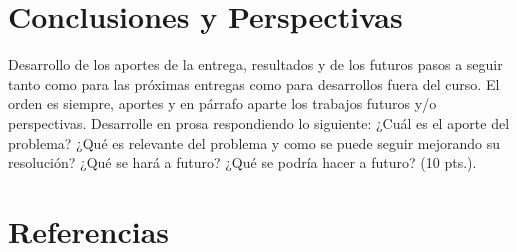 \documentclass[journal, 10pt]{IEEEtran}
\begin{document}


\section{Conclusiones y Perspectivas}

Desarrollo de los aportes de la entrega, resultados y de los futuros pasos a seguir tanto como para las próximas entregas como para desarrollos fuera del curso. El orden es siempre, aportes y en párrafo aparte los trabajos futuros y/o perspectivas. Desarrolle en prosa respondiendo lo siguiente: ¿Cuál es el aporte del problema? ¿Qué es relevante del problema y como se puede seguir mejorando su resolución? ¿Qué se hará a futuro? ¿Qué se podría hacer a futuro? (10 pts.).

\newpage

\section{Referencias}


\end{document}
